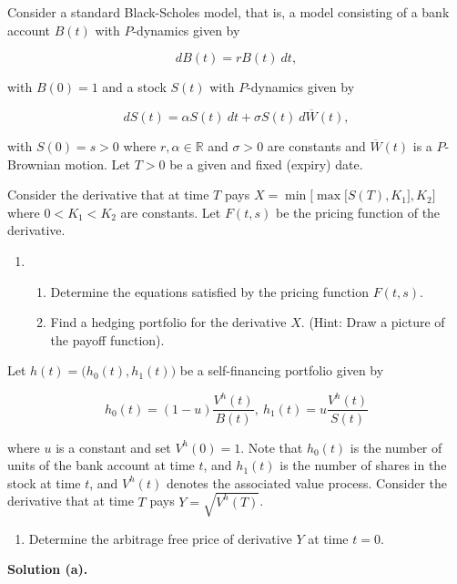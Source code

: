 \documentclass[a4paper,12pt,openany]{book}
\providecommand{\tightlist}{%
 \setlength{\itemsep}{0pt}\setlength{\parskip}{0pt}}
\begin{document}
Consider a standard Black-Scholes model, that is, a model consisting of a bank account \(B(t)\) with \(P\)-dynamics given by

\[
dB(t)=rB(t)\ dt,
\]

with \(B(0)=1\) and a stock \(S(t)\) with \(P\)-dynamics given by

\[
dS(t)=\alpha S(t)\ dt+\sigma S(t)\ d\overline{W}(t),
\]

with \(S(0)=s>0\) where \(r,\alpha\in\mathbb{R}\) and \(\sigma >0\) are constants and \(\overline{W}(t)\) is a \(P\)-Brownian motion. Let \(T>0\) be a given and fixed (expiry) date.

Consider the derivative that at time \(T\) pays \(X=\min\Big[\max\Big[S(T),K_1\Big],K_2\Big]\) where \(0<K_1<K_2\) are constants. Let \(F(t,s)\) be the pricing function of the derivative.

\begin{enumerate}
\def\labelenumi{\alph{enumi}.}
\item
  \begin{enumerate}
  \def\labelenumii{\roman{enumii}.}
  \tightlist
  \item
    Determine the equations satisfied by the pricing function \(F(t,s)\).
  \item
    Find a hedging portfolio for the derivative \(X\). (Hint: Draw a picture of the payoff function).
  \end{enumerate}
\end{enumerate}

Let \(h(t)=\Big(h_0(t),h_1(t)\Big)\) be a self-financing portfolio given by

\[
h_0(t)=(1-u)\frac{V^h(t)}{B(t)},\ h_1(t)=u\frac{V^h(t)}{S(t)}
\]

where \(u\) is a constant and set \(V^h(0)=1\). Note that \(h_0(t)\) is the number of units of the bank account at time \(t\), and \(h_1(t)\) is the number of shares in the stock at time \(t\), and \(V^h(t)\) denotes the associated value process. Consider the derivative that at time \(T\) pays \(Y=\sqrt{V^h(T)}\).

\begin{enumerate}
\def\labelenumi{\alph{enumi}.}
\setcounter{enumi}{1}
\tightlist
\item
  Determine the arbitrage free price of derivative \(Y\) at time \(t=0\).
\end{enumerate}

\noindent\makebox[\linewidth]{\rule{\textwidth}{0.4pt}}

\textbf{Solution (a).}
\end{document}

